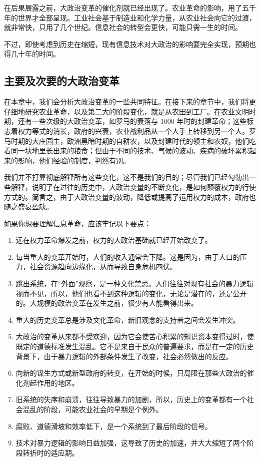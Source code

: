 在后果展露之前，大政治变革的催化剂就已经出现了。农业革命的影响，用了五千年的世界才全部呈现。工业社会基于制造业和化学力量，从农业社会向它的过渡，就非常快，只用了几个世纪。信息社会的转型会更快，可能只需一生的时间。

不过，即使考虑到历史在缩短，现有信息技术对大政治的影响要完全实现，预期也得几十年的时间。

\subsection{主要及次要的大政治变革}
在本章中，我们会分析大政治变革的一些共同特征。在接下来的章节中，我们将更仔细地研究农业革命，以及第二大的阶段变化，就是从农田到工厂。在农业文明时期，还有一些次级的大政治变革，如罗马的衰落与 1000 年时的封建革命；这些标志着权力等式的消长，政府的兴衰，农业战利品从一个人手上转移到另一个人。罗马时期的大庄园主，欧洲黑暗时期的自耕农，以及封建时代的领主和农奴，他们吃着同一块地里长出来的粮食；但由于不同的技术、气候的波动、疾病的破坏累积起来的影响，他们经验的制度，判然有别。

我们并不打算彻底解释所有这些变化，这不是我们的目的；尽管我们已经勾勒出一些解释，说明了在过往的历史中，大政治变量的不断变化，是如何颠覆权力的行使方式的。简言之，由于大政治变量的波动，降低或提高了运用权力的成本，政府也随之盛衰盈缺。

如果你想要理解信息革命，应该牢记以下要点：

\begin{enumerate}
    \item 远在权力革命爆发之前，权力的大政治基础就已经开始改变了。
    \item 每当重大的变革开始时，人们的收入通常会下降。这是因为，由于人口的压力，社会资源趋向边缘化，从而导致自身危机四伏。
    \item 跳出系统，在“外面”观察，是一种文化禁忌。人们往往对现有社会的暴力逻辑视而不见，所以，他们也看不到这种逻辑的变化，无论是潜在的，还是公开的。大规模的政治变革在发生之前，很少有人能看得出来。
    \item 重大的历史变革总是涉及文化革命，新旧观念的支持者之间会发生冲突。
    \item 大政治的变革从来都不受欢迎，因为它会使苦心积累的知识资本变得过时，使既定的道德标准发生混乱。它不是来自于民众的普遍要求，而是在一定的历史背景下，由于暴力逻辑的外部条件发生了改变，社会必然做出的反应。
    \item 向新的谋生方式或新型政府的转变，在开始的时候，只局限在那些大政治的催化剂起作用的地区。
    \item 旧系统的失序和崩溃，往往导致暴力的加剧，所以，历史上的变革都有一个社会混乱的阶段，可能农业社会的早期是个例外。
    \item 腐败、道德滑坡和效率低下，是一个系统到了最后阶段的信号。
    \item 技术对暴力逻辑的影响日益加强，这导致了历史的加速，并大大缩短了两个阶段转折时的适应期。
\end{enumerate}


